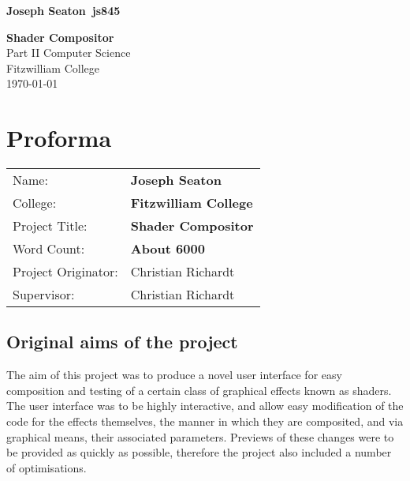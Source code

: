 \documentclass[12pt,twoside,notitlepage]{report}
\begin{document}


\newcommand{\name}{Joseph Seaton}
\newcommand{\college}{Fitzwilliam College}
\newcommand{\ptitle}{Shader Compositor}

\setcounter{page}{1}
\pagestyle{plain}



\pagestyle{empty}

\hfill{\LARGE \bf \name ~js845}

\vspace*{60mm}
\begin{center}
\Huge
{\bf \ptitle} \\
\vspace*{5mm}
Part II Computer Science \\
\vspace*{5mm}
\college \\
\vspace*{5mm}
\today  %
\end{center}

\cleardoublepage




\chapter*{Proforma}

{\large
\begin{tabular}{ll}
Name:               & \bf \name    \\
College:            & \bf \college \\
Project Title:      & \bf \ptitle  \\
Word Count:         & \bf About 6000 \\
Project Originator: & Christian Richardt                    \\
Supervisor:         & Christian Richardt                    \\ 
\end{tabular}
}


\section*{Original aims of the project}
The aim of this project was to produce a novel user interface for easy composition and testing of a certain class of graphical effects known as shaders. The user interface was to be highly interactive, and allow easy modification of the code for the effects themselves, the manner in which they are composited, and via graphical means, their associated parameters. Previews of these changes were to be provided as quickly as possible, therefore the project also included a number of optimisations.
\end{document}
